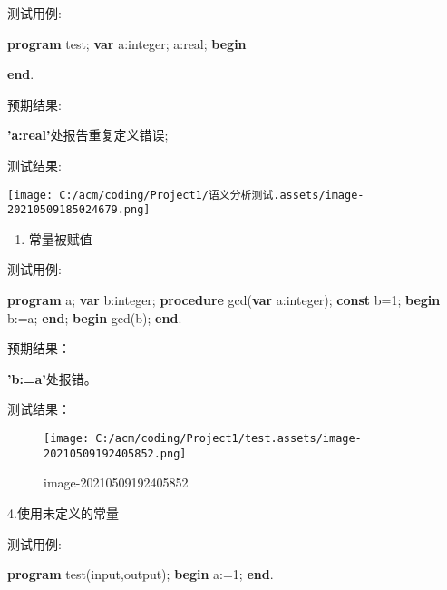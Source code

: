 \documentclass[]{ctexart}
\newenvironment{Shaded}{}{}
\newcommand{\DataTypeTok}[1]{\textcolor[rgb]{0.56,0.13,0.00}{#1}}
\newcommand{\DecValTok}[1]{\textcolor[rgb]{0.25,0.63,0.44}{#1}}
\newcommand{\KeywordTok}[1]{\textcolor[rgb]{0.00,0.44,0.13}{\textbf{#1}}}
\newcommand{\NormalTok}[1]{#1}
\begin{document}
测试用例:

\begin{Shaded}
\begin{Highlighting}[]
  \KeywordTok{program}\NormalTok{ test;}
  \KeywordTok{var}
\NormalTok{  	a:}\DataTypeTok{integer}\NormalTok{;}
\NormalTok{  	a:}\DataTypeTok{real}\NormalTok{;}
  \KeywordTok{begin}
  	
  \KeywordTok{end}\NormalTok{.}
\end{Highlighting}
\end{Shaded}

预期结果:

\textbf{'a:real'}处报告重复定义错误;

测试结果:

\texttt{[image: C:/acm/coding/Project1/语义分析测试.assets/image-20210509185024679.png]}

\begin{enumerate}
\def\labelenumi{\arabic{enumi}.}
\item
  常量被赋值
\end{enumerate}

测试用例:

\begin{Shaded}
\begin{Highlighting}[]
  
  \KeywordTok{program}\NormalTok{ a;}
  \KeywordTok{var}
\NormalTok{      b:}\DataTypeTok{integer}\NormalTok{;}
  \KeywordTok{procedure}\NormalTok{ gcd(}\KeywordTok{var}\NormalTok{ a:}\DataTypeTok{integer}\NormalTok{);}
  \KeywordTok{const}
\NormalTok{      b=}\DecValTok{1}\NormalTok{;}
  \KeywordTok{begin}
\NormalTok{      b:=a;}
  \KeywordTok{end}\NormalTok{;}
  \KeywordTok{begin}
\NormalTok{      gcd(b);}
  \KeywordTok{end}\NormalTok{.}
  
\end{Highlighting}
\end{Shaded}

预期结果：

\textbf{'b:=a'}处报错。

测试结果：

\begin{figure}
\centering
\texttt{[image: C:/acm/coding/Project1/test.assets/image-20210509192405852.png]}
\caption{image-20210509192405852}
\end{figure}

4.使用未定义的常量

测试用例:

\begin{Shaded}
\begin{Highlighting}[]
\KeywordTok{program}\NormalTok{ test(input,output);   }
\KeywordTok{begin}
\NormalTok{	a:=}\DecValTok{1}\NormalTok{;}
\KeywordTok{end}\NormalTok{.}
\end{Highlighting}
\end{Shaded}
\end{document}
